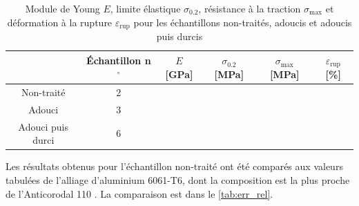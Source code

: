 \begin{table}[h]
    \centering
    \begin{tabular}{ |c||c|c|c|c|c| }
        \cline{2-6}
        \multicolumn{1}{c|}{} & Échantillon n$^\circ$ & \(E\) [GPa] & \(\sigma_{0.2}\) [MPa] & \(\sigma_{\textrm{max}}\) [MPa] & \(\varepsilon_{\textrm{rup}}\) [\%] \\
        \hline
        \multirow{1}{4cm}{Non-traité}
        & 2 &  &  &  &  \\
        \hline
        \multirow{1}{4cm}{Adouci}
        & 3 &  &  &  &  \\
        \hline
        \multirow{1}{4cm}{Adouci puis durci}
        & 6 &  &  &  &  \\
        \hline
    \end{tabular}
    \caption{Module de Young \(E\), limite élastique \(\sigma_{0.2}\), résistance à la traction \(\sigma_{\textrm{max}}\) et déformation à la rupture \(\varepsilon_{\textrm{rup}}\) pour les échantillons non-traités, adoucis et adoucis puis durcis}
    \label{tab:results}
\end{table}

Les résultats obtenus pour l'échantillon non-traité ont été comparés aux valeurs tabulées de l'alliage d'aluminium 6061-T6, dont la composition est la plus proche de l'Anticorodal 110 \cite{alualualu}. La comparaison est dans le \autoref{tab:err_rel}.

